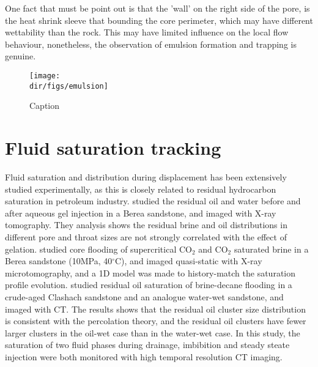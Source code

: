 One fact that must be point out is that the 'wall' on the right side of the pore, is the heat shrink sleeve that bounding the core perimeter, which may have different wettability than the rock. This may have limited influence on the local flow behaviour, nonetheless, the observation of emulsion formation and trapping is genuine.

\begin{figure}
    \centering
    \texttt{[image: \\dir/figs/emulsion]}
    \caption{Caption}
    \label{emulsion}
\end{figure}

\section{Fluid saturation tracking}
Fluid saturation and distribution during displacement has been extensively studied experimentally, as this is closely related to residual hydrocarbon saturation in petroleum industry. \citet{prodanovic20073d} studied the residual oil and water before and after aqueous gel injection in a Berea sandstone, and imaged with X-ray tomography. They analysis shows the residual brine and oil distributions in different pore and throat sizes are not strongly correlated with the effect of gelation. \citet{shi2011supercritical} studied core flooding of supercritical CO$_2$ and CO$_2$ saturated brine in a Berea sandstone (10MPa, 40$^\circ$C), and imaged quasi-static with X-ray microtomography, and a 1D model was made to history-match the saturation profile evolution.  \citet{iglauer2012comparison} studied residual oil saturation of brine-decane flooding in a crude-aged Clashach sandstone and an analogue water-wet sandstone, and imaged with \textmu CT. The results shows that the residual oil cluster size distribution is consistent with the percolation theory, and the residual oil clusters have fewer larger clusters in the oil-wet case than in the water-wet case. In this study, the saturation of two fluid phases during drainage, imbibition and steady steate injection were both monitored with high temporal resolution \textmu CT imaging.

